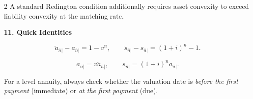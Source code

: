 \documentclass[10pt]{article}
\newcommand{\sect}[1]{%
  \vspace{4pt}%
  \noindent\colorbox{softgreen}{\parbox{\dimexpr\linewidth-2\fboxsep\relax}{\color{deepgreen}\bfseries #1}}%
  \vspace{3pt}%
}
\newcommand{\ann}[1]{a_{\overline{#1}|}}
\newcommand{\annDue}[1]{\ddot{a}_{\overline{#1}|}}
\newcommand{\acc}[1]{s_{\overline{#1}|}}
\newcommand{\accDue}[1]{\ddot{s}_{\overline{#1}|}}
\begin{document}
\begin{multicols}{2}
A standard Redington condition additionally requires asset convexity to exceed liability convexity at the matching rate.

\sect{11. Quick Identities}

\[ \annDue{n}-\ann{n}=1-v^n, \qquad \accDue{n}-\acc{n}=(1+i)^n-1. \]

\[ \ann{n}=v\annDue{n}, \qquad \acc{n}=(1+i)^n\ann{n}. \]

For a level annuity, always check whether the valuation date is \emph{before the first payment} (immediate) or \emph{at the first payment} (due).

\end{multicols}
\end{document}
